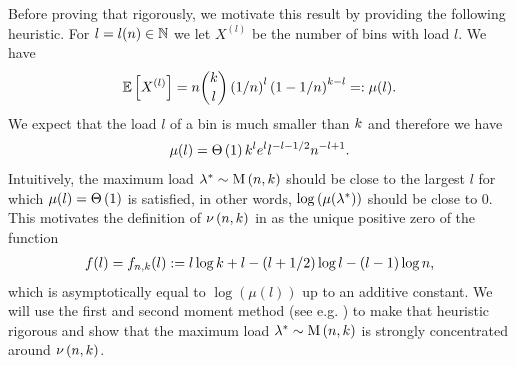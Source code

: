 Before proving that rigorously, we motivate this result by providing the following heuristic. For $l=l(n)\in\mathbb{N}$ we let $X^{(l)}$ be the number of bins with load $l$. We have 
\begin{align}\label{MDeq:28}
	\mathbb{E}\left[X^{(l)}\right]=n\binom{k}{l}\left(1/n\right)^l\left(1-1/n\right)^{k-l}=:\mu(l).
\end{align}
We expect that the load $l$ of a bin is much smaller than $k$ and therefore we have
\begin{align*}
	\mu(l)=\Theta\left(1\right)k^le^ll^{-l-1/2}n^{-l+1}.
\end{align*}
Intuitively, the maximum load $\lambda^\ast\sim \operatorname{M}\left(n, k\right)$ should be close to the largest $l$ for which $\mu(l)=\Theta\left(1\right)$ is satisfied, in other words, $\log \left(\mu(\lambda^\ast)\right)$ should be close to 0. This motivates the definition of $\nu\left(n, k\right)$ in  as the unique positive zero of the function
\begin{align*}
	f(l)=f_{n, k}(l):=l\log k+l-(l+1/2)\log l-(l-1)\log n,
\end{align*}
which is asymptotically equal to $\log\left(\mu(l)\right)$ up to an additive constant. We will use the first and second moment method (see e.g. \cite{AlonSpencer2008,FriezeKaronski2016}) to make that heuristic rigorous and show that the maximum load $\lambda^\ast\sim \operatorname{M}\left(n, k\right)$ is strongly concentrated around $\nu\left(n, k\right)$.

